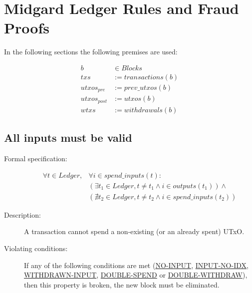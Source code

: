 \documentclass[../midgard.tex]{subfiles}
\begin{document}
\section{Midgard Ledger Rules and Fraud Proofs}
\label{sec:ledger-rules-fraud-proofs}

In the following sections the following premises are used:

\begin{equation*}
\begin{split}
           b & \in Blocks          \\
         txs & := transactions(b)  \\
 utxos_{pre} & := prev\_utxos(b)   \\
utxos_{post} & := utxos(b)         \\
        wtxs & := withdrawals(b)
\end{split}
\end{equation*}

\subsection{All inputs must be valid}

\begin{description}

\item[Formal specification:]
\begin{equation*}
\begin{split}
    \forall t \in Ledger, &\forall i \in spend\_inputs(t): \\
    &( \exists t_1 \in Ledger, t \neq t_1 \land i \in outputs(t_1) ) \land \\
    &( \nexists t_2 \in Ledger, t \neq t_2 \land i \in spend\_inputs(t_2) )
\end{split}
\end{equation*}

\item[Description:] A transaction cannot spend a non-existing (or an already spent) UTxO.
\item[Violating conditions:] If any of the following conditions are met (\hyperref[sec:NO-INPUT]{NO-INPUT}, \hyperref[sec:INPUT-NO-IDX]{INPUT-NO-IDX}, \hyperref[sec:WITHDRAWN-INPUT]{WITHDRAWN-INPUT}, \hyperref[sec:DOUBLE-SPEND]{DOUBLE-SPEND} or \hyperref[sec:DOUBLE-WITHDRAW]{DOUBLE-WITHDRAW}), then this property is broken, the new block must be eliminated.

\end{description}
\end{document}
